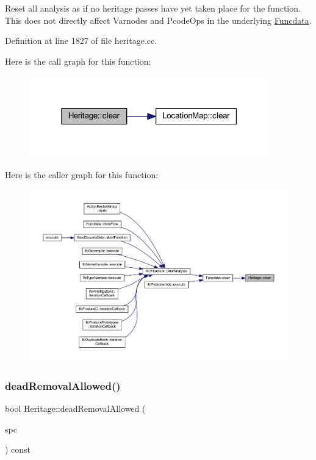 Reset all analysis as if no heritage passes have yet taken place for the function. This does not directly affect Varnodes and Pcode\+Ops in the underlying \mbox{\hyperlink{class_funcdata}{Funcdata}}. 

Definition at line 1827 of file heritage.\+cc.

Here is the call graph for this function\+:
\nopagebreak
\begin{figure}[H]
\begin{center}
\leavevmode
\includegraphics[width=295pt]{class_heritage_a7cdea4058aa42f91bbdb5a9b3171950f_cgraph}
\end{center}
\end{figure}
Here is the caller graph for this function\+:
\nopagebreak
\begin{figure}[H]
\begin{center}
\leavevmode
\includegraphics[width=350pt]{class_heritage_a7cdea4058aa42f91bbdb5a9b3171950f_icgraph}
\end{center}
\end{figure}
\mbox{\label{class_heritage_a664720f99b5b26c63a5f0349f4a83a0c}} 
\subsubsection{\texorpdfstring{deadRemovalAllowed()}{deadRemovalAllowed()}}
{\footnotesize\ttfamily bool Heritage\+::dead\+Removal\+Allowed (\begin{DoxyParamCaption}\item[{\mbox{\hyperlink{class_addr_space}{Addr\+Space}} $\ast$}]{spc }\end{DoxyParamCaption}) const}



